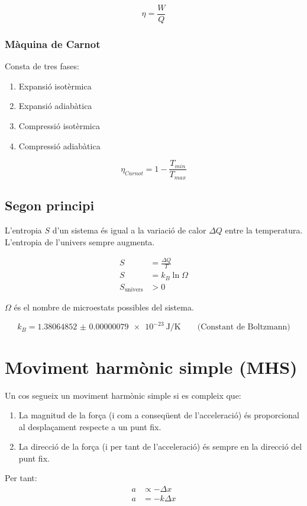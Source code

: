 \begin{equation}
    \eta = \frac{W}{Q}
\end{equation}

\subsubsection{Màquina de Carnot}
\label{ssub:maquina_de_carnot}

Consta de tres fases:

\begin{enumerate}
    \item Expansió isotèrmica
    \item Expansió adiabàtica
    \item Compressió isotèrmica
    \item Compressió adiabàtica
\end{enumerate}

\begin{equation}
    \eta_{Carnot} = 1 - \frac{T_{min}}{T_{max}}
\end{equation}

\subsection{Segon principi}
\label{sub:segon_principi}

L'entropia $S$ d'un sistema és igual a la variació de calor $\Delta Q$ entre la
temperatura. L'entropia de l'univers sempre augmenta.

\begin{align}
    S &= \frac{\Delta Q}{T} \\
    S &= k_B \ln \Omega \\
    S_\text{univers} &> 0
\end{align}

$\Omega$ és el nombre de microestats possibles del sistema.

\begin{equation}
    k_B =  \SI{1.38064852(79)e-23}{\joule\per\kelvin} \qquad \text{(Constant de Boltzmann)}
\end{equation}

\section{Moviment harmònic simple (MHS)}
\label{sec:moviment_harmonic_simple}

Un cos segueix un moviment harmònic simple si es compleix que:
\begin{enumerate}
    \item La magnitud de la força (i com a conseqüent de l'acceleració)
        és proporcional al desplaçament respecte a un punt fix.
    \item La direcció de la força (i per tant de l'acceleració) és sempre en la
        direcció del punt fix.
\end{enumerate}
Per tant:
\begin{align}
    a &\propto -\Delta x\\
    a &= -k\Delta x
\end{align}

